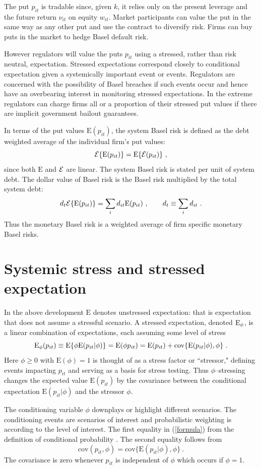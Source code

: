 \documentclass[authoryear]{elsarticle}
\newcommand{\E}{\mathrm{E}}
\newcommand{\cov}{\mathrm{cov}}
\newcommand{\Ex}{{\cal E}}
\newcommand{\eref}[1]{(\ref{#1})}
\newcommand{\cq}{\ , \qquad}
\newcommand{\be}[1]{\begin{equation}\label{#1}}
\newcommand{\ee}{\end{equation}}
\begin{document}
The put $p_{it}$ is tradable since, given $k$, it relies only on the present leverage and the future return $\nu_{it}$ on equity $w_{it}$.  Market participants can value the put in  the same way as any other put and use the contract to diversify risk.  Firms can buy puts in the market to hedge Basel default risk.    

However regulators will value the puts $p_{it}$ using a stressed, rather than risk neutral, expectation.   Stressed expectations correspond closely to conditional expectation given a systemically important event or events.    Regulators are concerned with the possibility of Basel breaches if such events occur and hence have an overbearing interest in monitoring stressed expectations.   In the extreme regulators can charge firms all or a  proportion of their stressed put values if there are implicit government bailout guarantees.

In terms of the put values $\E(p_{it})$, the  system Basel risk is defined as the debt weighted average of the individual firm's put values:
\be{nsrisk}
\Ex\{\E(p_{it})\} = \E\{\Ex(p_{it})\}  \ , 
\ee
since both $\E$ and $\Ex$ are linear.
The  system Basel risk is stated per unit of system debt.  The dollar value of Basel risk is the Basel risk multiplied by the total system debt:
$$
d_t\Ex\{\E(p_{it})\}  = \sum_id_{it}\E(p_{it}) \cq d_t\equiv\sum_id_{it}\ .
$$
Thus the monetary  Basel risk is a  weighted average  of firm specific monetary Basel risks.  




\section{Systemic stress and stressed expectation}

In the above development $\E$  denotes  unstressed expectation:  that is expectation that does not assume a stressful scenario.   A stressed expectation, denoted $\Es$, is a
linear combination of  expectations, each assuming some level of stress
\be{formula}
\Es(p_{it}) \equiv \E\{\phi\E(p_{it}|\phi)\} = \E(\phi p_{it}) = \E(p_{it}) + \cov\{\E(p_{it}|\phi),\phi\}\ .
\ee 
Here $\phi\ge 0$ with $\E(\phi)=1$ is thought of as a stress factor or ``stressor,"  defining events impacting $p_{it}$  and serving as a basis for stress testing.  Thus $\phi$--stressing  changes the expected value $\E(p_{it})$ by the covariance between the conditional expectation $\E(p_{it}|\phi)$  and the stressor $\phi$.

The conditioning variable $\phi$  downplays or highlight different scenarios.  The conditioning events are scenarios of interest and  probabilistic weighting is according to the level of interest.  The first equality in \eref{formula}  from the definition of conditional probability \citep{whittle2000probability}.  The second equality follows from
$$
\cov(p_{it},\phi)=\cov\{\E(p_{it}|\phi),\phi\}\ .
$$
The covariance is zero whenever  $p_{it}$ is independent of $\phi$ which occurs if $\phi=1$.
\end{document}
